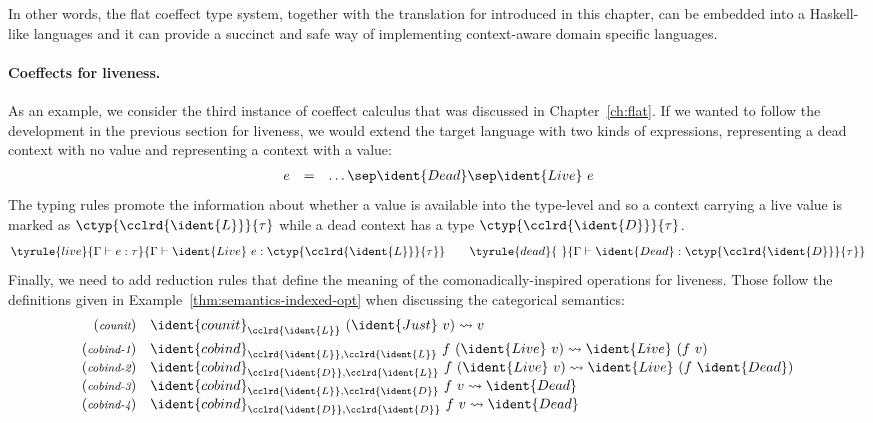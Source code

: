 In other words, the flat coeffect type system, together with the translation for introduced in this
chapter, can be embedded into a Haskell-like languages and it can provide a succinct and safe way
of implementing context-aware domain specific languages.

\paragraph{Coeffects for liveness.}
As an example, we consider the third instance of coeffect calculus that was discussed in
Chapter~\ref{ch:flat}. If we wanted to follow the development in the previous section for liveness,
we would extend the target language with two kinds of expressions,  representing a dead
context with no value and  representing a context with a value:
%
\begin{equation*}
\begin{array}{rcl}
e &=& \ldots \sep \ident{Dead} \sep \ident{Live}~e \\
\end{array}
\end{equation*}
%
The typing rules promote the information about whether a value is available into the type-level
and so a context carrying a live value is marked as $\ctyp{\cclrd{\ident{L}}}{\tau}$ while a
dead context has a type $\ctyp{\cclrd{\ident{D}}}{\tau}$.
%
\begin{equation*}
\tyrule{live}
  { \Gamma \vdash e:\tau }
  { \Gamma \vdash \ident{Live}~e : \ctyp{\cclrd{\ident{L}}}{\tau} }
\qquad
\tyrule{dead}
  { ~ }
  { \Gamma \vdash \ident{Dead} : \ctyp{\cclrd{\ident{D}}}{\tau} }
\end{equation*}
%
Finally, we need to add reduction rules that define the meaning of the comonadically-inspired
operations for liveness. Those follow the definitions given in Example~\ref{thm:semantics-indexed-opt}
when discussing the categorical semantics:
%
\begin{equation*}
\begin{array}{rl}
{\footnotesize(\emph{counit})} &
  \ident{counit}_{\cclrd{ \ident{L} }}~(\ident{Just}~v)   \rightsquigarrow v
\\[0.5em]
{\footnotesize(\emph{cobind-1})} &
  \ident{cobind}_{\cclrd{\ident{L}}, \cclrd{\ident{L}}}~f~(\ident{Live}~v) \rightsquigarrow \ident{Live}~(f~v)
\\
{\footnotesize(\emph{cobind-2})} &
  \ident{cobind}_{\cclrd{\ident{D}}, \cclrd{\ident{L}}}~f~(\ident{Live}~v) \rightsquigarrow \ident{Live}~(f~\ident{Dead})
\\
{\footnotesize(\emph{cobind-3})} &
  \ident{cobind}_{\cclrd{\ident{L}}, \cclrd{\ident{D}}}~f~v \rightsquigarrow \ident{Dead}
\\
{\footnotesize(\emph{cobind-4})} &
  \ident{cobind}_{\cclrd{\ident{D}}, \cclrd{\ident{D}}}~f~v \rightsquigarrow \ident{Dead}
\end{array}
\end{equation*}
